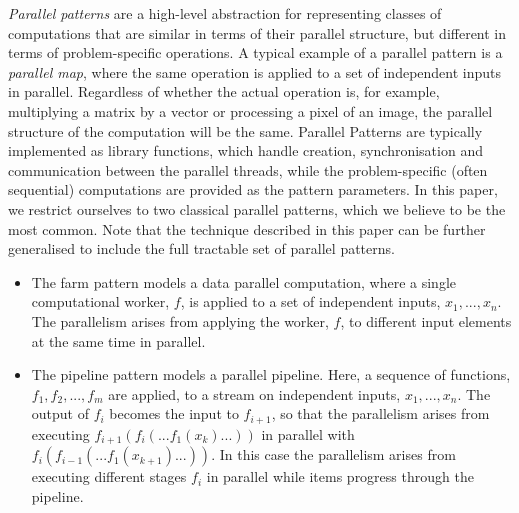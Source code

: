 \noindent
\emph{Parallel patterns} are a high-level abstraction for representing classes of computations that are similar in terms of their parallel structure, but different in terms of problem-specific operations. A typical example of a parallel pattern is a \emph{parallel map}, where the same operation is applied to a set of independent inputs in parallel. Regardless of whether the actual operation is, for example, multiplying a matrix by a vector or processing a pixel of an image, the parallel structure of the computation will be the same. Parallel Patterns are typically implemented as library functions, which handle creation, synchronisation and communication between the parallel threads, while the problem-specific (often sequential) computations are provided as the pattern parameters. In this paper, we restrict ourselves to two classical parallel patterns, which we believe to be the most common. Note that the technique described in this paper can be further generalised to include the full tractable set of parallel patterns.
\begin{itemize}
    \item The farm pattern models a data parallel computation, where a single computational worker, $f$, is applied to a set of independent inputs, $x_{1}, ..., x_{n}$. The parallelism arises from applying the worker, $f$, to different input elements at the same time in parallel. 
    \item The pipeline pattern models a parallel pipeline. Here, a sequence of functions, $f_{1}, f_{2}, ..., f_{m}$ are applied, to a stream on independent inputs, $x_{1}, ..., x_{n}$. The output of $f_{i}$ becomes the input to $f_{i+1}$, so that the parallelism arises from executing $f_{i+1}(f_{i}(...f_{1}(x_{k})...))$ in parallel with $f_{i}(f_{i-1}(...f_{1}(x_{k+1})...))$. In this case the parallelism arises from executing different stages $f_{i}$ in parallel while items progress through the pipeline.
\end{itemize}


